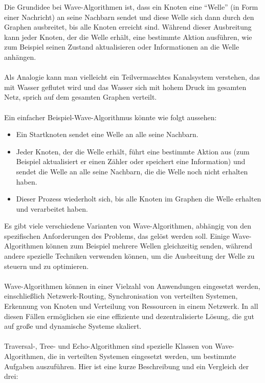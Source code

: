 Die Grundidee bei Wave-Algorithmen ist, dass ein Knoten eine \enquote{Welle} (in Form einer Nachricht) an seine Nachbarn sendet und diese Welle sich dann durch den Graphen ausbreitet, bis alle Knoten erreicht sind. Während dieser Ausbreitung kann jeder Knoten, der die Welle erhält, eine bestimmte Aktion ausführen, wie zum Beispiel seinen Zustand aktualisieren oder Informationen an die Welle anhängen.
\\\\
Als Analogie kann man vielleicht ein Teilvermaschtes Kanalsystem verstehen, das mit Wasser geflutet wird und das Wasser sich mit hohem Druck im gesamten Netz, sprich auf dem gesamten Graphen verteilt. 
\\\\
Ein einfacher Beispiel-Wave-Algorithmus könnte wie folgt aussehen:
\begin{itemize}
\item Ein Startknoten sendet eine Welle an alle seine Nachbarn.
\item Jeder Knoten, der die Welle erhält, führt eine bestimmte Aktion aus (zum Beispiel aktualisiert er einen Zähler oder speichert eine Information) und sendet die Welle an alle seine Nachbarn, die die Welle noch nicht erhalten haben.
\item Dieser Prozess wiederholt sich, bis alle Knoten im Graphen die Welle erhalten und verarbeitet haben.
\end{itemize}
Es gibt viele verschiedene Varianten von Wave-Algorithmen, abhängig von den spezifischen Anforderungen des Problems, das gelöst werden soll. Einige Wave-Algorithmen können zum Beispiel mehrere Wellen gleichzeitig senden, während andere spezielle Techniken verwenden können, um die Ausbreitung der Welle zu steuern und zu optimieren.
\\\\
Wave-Algorithmen können in einer Vielzahl von Anwendungen eingesetzt werden, einschließlich Netzwerk-Routing, Synchronisation von verteilten Systemen, Erkennung von Knoten und Verteilung von Ressourcen in einem Netzwerk. In all diesen Fällen ermöglichen sie eine effiziente und dezentralisierte Lösung, die gut auf große und dynamische Systeme skaliert.
\\\\
Traversal-, Tree- und Echo-Algorithmen sind spezielle Klassen von Wave-Algorithmen, die in verteilten Systemen eingesetzt werden, um bestimmte Aufgaben auszuführen. Hier ist eine kurze Beschreibung und ein Vergleich der drei:
